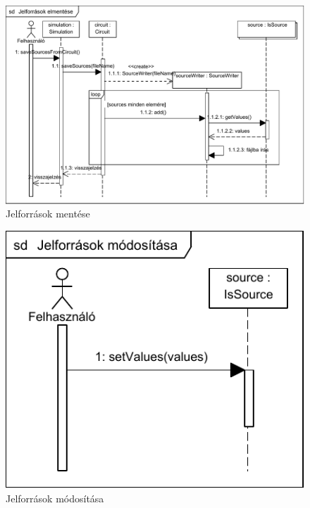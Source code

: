 \begin{figure}[H]
\begin{center}
\includegraphics{chapters/chapter04/seqdiagrams/jelforrasok_mentese.pdf}
\caption{Jelforrások mentése}
\label{fig:jelforrasok_mentese}
\end{center}
\end{figure}

\begin{figure}[H]
\begin{center}
\includegraphics{chapters/chapter04/seqdiagrams/jelforrasok_modositasa.pdf}
\caption{Jelforrások módosítása}
\label{fig:jelforrasok_modositasa}
\end{center}
\end{figure}




